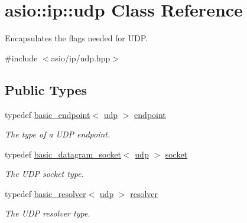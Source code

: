 \hypertarget{classasio_1_1ip_1_1udp}{}\section{asio\+:\+:ip\+:\+:udp Class Reference}
\label{classasio_1_1ip_1_1udp}


Encapsulates the flags needed for U\+D\+P.  




{\ttfamily \#include $<$asio/ip/udp.\+hpp$>$}

\subsection*{Public Types}
\begin{DoxyCompactItemize}
\item 
typedef \hyperlink{classasio_1_1ip_1_1basic__endpoint}{basic\+\_\+endpoint}$<$ \hyperlink{classasio_1_1ip_1_1udp}{udp} $>$ \hyperlink{classasio_1_1ip_1_1udp_a6356426903164272827153752845368c}{endpoint}
\begin{DoxyCompactList}\small\item\em The type of a U\+D\+P endpoint. \end{DoxyCompactList}\item 
typedef \hyperlink{classasio_1_1basic__datagram__socket}{basic\+\_\+datagram\+\_\+socket}$<$ \hyperlink{classasio_1_1ip_1_1udp}{udp} $>$ \hyperlink{classasio_1_1ip_1_1udp_ab8f8cc1a666bdbbd6c3963f2396f253e}{socket}
\begin{DoxyCompactList}\small\item\em The U\+D\+P socket type. \end{DoxyCompactList}\item 
typedef \hyperlink{classasio_1_1ip_1_1basic__resolver}{basic\+\_\+resolver}$<$ \hyperlink{classasio_1_1ip_1_1udp}{udp} $>$ \hyperlink{classasio_1_1ip_1_1udp_abb4d8eff41b11c6c2053bf799d43dba2}{resolver}
\begin{DoxyCompactList}\small\item\em The U\+D\+P resolver type. \end{DoxyCompactList}\end{DoxyCompactItemize}
